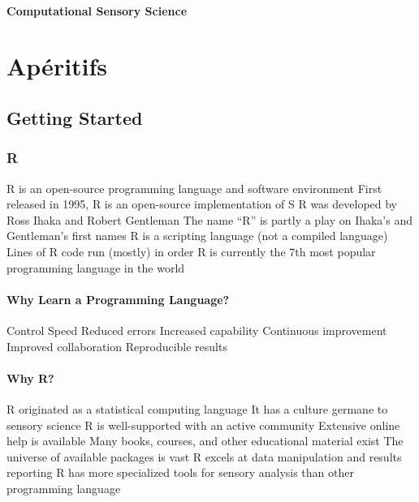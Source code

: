 \documentclass[
]{book}
\begin{document}
\hypertarget{computational-sensory-science}{%
\subsection*{Computational Sensory Science}\label{computational-sensory-science}}

\hypertarget{part-apuxe9ritifs}{%
\part*{Apéritifs}\label{part-apuxe9ritifs}}

\hypertarget{start-R}{%
\chapter{Getting Started}\label{start-R}}

\hypertarget{r}{%
\section{R}\label{r}}

R is an open-source programming language and software environment
First released in 1995, R is an open-source implementation of S
R was developed by Ross Ihaka and Robert Gentleman
The name ``R'' is partly a play on Ihaka's and Gentleman's first names
R is a scripting language (not a compiled language)
Lines of R code run (mostly) in order
R is currently the 7th most popular programming language in the world

\hypertarget{why-learn-a-programming-language}{%
\subsection{Why Learn a Programming Language?}\label{why-learn-a-programming-language}}

Control
Speed
Reduced errors
Increased capability
Continuous improvement
Improved collaboration
Reproducible results

\hypertarget{why-r}{%
\subsection{Why R?}\label{why-r}}

R originated as a statistical computing language
It has a culture germane to sensory science
R is well-supported with an active community
Extensive online help is available
Many books, courses, and other educational material exist
The universe of available packages is vast
R excels at data manipulation and results reporting
R has more specialized tools for sensory analysis than other programming language
\end{document}
